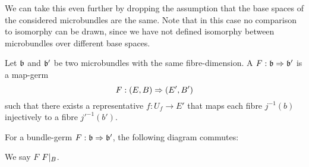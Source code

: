 \begin{myparagraph}
    We can take this even further by dropping the assumption that the base spaces of the considered microbundles are the same.
    Note that in this case no comparison to isomorphy can be drawn,
    since we have not defined isomorphy between microbundles over different base spaces.
\end{myparagraph}

\begin{mydefinition}
    Let $\mathfrak{b}$ and $\mathfrak{b}'$ be two microbundles with the same fibre-dimension.
    A  $F: \mathfrak{b} \Rightarrow \mathfrak{b}'$ is a map-germ
    \[ F: (E, B) \Rightarrow (E', B') \]
    such that there exists a representative $f: U_f \to E'$ that maps each fibre $j^{-1}(b)$ injectively to a fibre $j'^{-1}(b')$.
\end{mydefinition}

\begin{myparagraph}
    For a bundle-germ $F: \mathfrak{b} \Rightarrow \mathfrak{b}'$, the following diagram commutes:
    \begin{center}
    \end{center}
    We say $F$  $F\vert_{B}$.
\end{myparagraph}